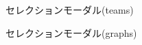 \documentclass[sotsuron]{kuee}
\begin{document}
			\begin{figure}
				\begin{center}
				\end{center}
				\caption{セレクションモーダル(teams)}
		  		\label{fig:selection_teams}
			\end{figure}
			\begin{figure}
				\begin{center}
				\end{center}
				\caption{セレクションモーダル(graphs)}
		  		\label{fig:selection_graphs}
			\end{figure}
\end{document}
